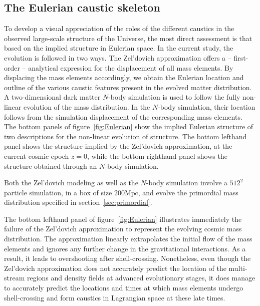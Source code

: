 \documentclass[a4paper, 11pt]{article}
\begin{document}
\subsection{The Eulerian caustic skeleton}
\label{sec:nbody}
To develop a visual appreciation of the roles of the different caustics in the observed large-scale structure of the Universe, the most direct assessment is that based on the implied structure in Eulerian space. In the current study, the evolution is followed in two ways. The Zel'dovich approximation offers a -- first-order -- analytical expression for the displacement of all mass elements. By displacing the mass elements accordingly, we obtain the Eulerian location and outline of the various caustic features present in the evolved matter distribution.  A two-dimensional dark matter $N$-body simulation \cite{Hidding:2020} is used to follow the fully non-linear evolution of the mass distribution. In the $N$-body simulation, their location follows from the simulation displacement of the corresponding mass elements. The bottom panels of figure~\ref{fig:Eulerian} show the implied Eulerian structure of two descriptions for the non-linear evolution of structure. The bottom lefthand panel shows the structure implied by the Zel'dovich approximation, at the current cosmic epoch $z=0$, while the bottom righthand panel shows the structure
obtained through an $N$-body simulation. 

Both the Zel'dovich modeling as well as the $N$-body simulation involve a $512^2$ particle simulation, in a box of size $200 \mbox{Mpc}$, and evolve the primordial mass distribution specified in section~\ref{sec:primordial}. 

The bottom lefthand panel of figure~\ref{fig:Eulerian} illustrates immediately the failure of the Zel'dovich approximation to represent the evolving cosmic mass distribution. The approximation linearly extrapolates the initial flow of the mass elements and ignores any further change in the gravitational interactions. As a result, it leads to overshooting after shell-crossing. Nonetheless, even though the Zel'dovich approximation does not accurately predict the location of the multi-stream regions and density fields at advanced evolutionary stages, it does manage to accurately predict the locations and times at which mass elements undergo shell-crossing and form caustics in Lagrangian space at these late times.
\end{document}
